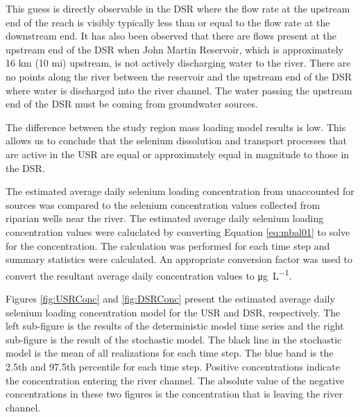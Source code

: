 This guess is directly observable in the DSR where the flow rate at the upstream end of the reach is visibly typically less than or equal to the flow rate at the downstream end.  It has also been observed that there are flows present at the upstream end of the DSR when John Martin Reservoir, which is approximately 16 km (10 mi) upstream, is not actively discharging water to the river.  There are no points along the river between the reservoir and the upstream end of the DSR where water is discharged into the river channel.  The water passing the upstream end of the DSR must be coming from groundwater sources.

The difference between the study region mass loading model results is low.  This allows us to conclude that the selenium dissolution and transport processes that are active in the USR are equal or approximately equal in magnitude to those in the DSR.


The estimated average daily selenium loading concentration from unaccounted for sources was compared to the selenium concentration values collected from riparian wells near the river.  The estimated average daily selenium loading concentration values were caluclated by converting Equation \ref{eq:mbal01} to solve for the concentration.  The calculation was performed for each time step and summary statistics were calculated.  An appropriate conversion factor was used to convert the resultant average daily concentration values to \si{\micro\g\per\liter}.

Figures \ref{fig:USRConc} and \ref{fig:DSRConc} present the estimated average daily selenium loading concentration model for the USR and DSR, respectively.  The left sub-figure is the results of the deterministic model time series and the right sub-figure is the result of the stochastic model.  The black line in the stochastic model is the mean of all realizations for each time step.  The blue band is the 2.5th and 97.5th percentile for each time step.  Positive concentrations indicate the concentration entering the river channel.  The absolute value of the negative concentrations in these two figures is the concentration that is leaving the river channel.

